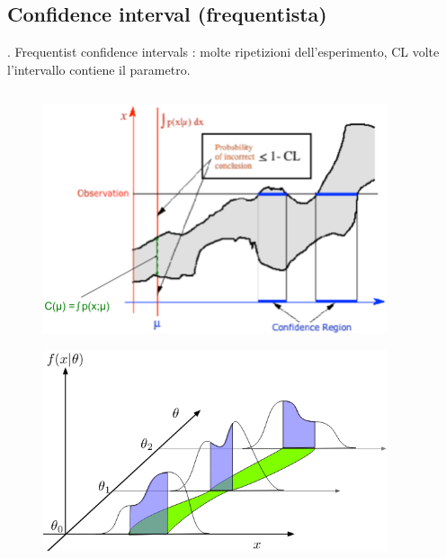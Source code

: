 \documentclass[asd-beamer.tex]{subfiles}
\begin{document}
\subsection{Confidence interval (frequentista)}

\begin{frame}{. Frequentist confidence intervals}
: molte ripetizioni dell'esperimento, CL volte l'intervallo contiene il parametro.
\begin{columns}[T]
\begin{column}{0.4\textwidth}
	\begin{figure}
		\centering
		\includegraphics[width=0.9\textwidth,keepaspectratio]{figures/interval/clband}
		\label{fig:clband}
	\end{figure}
	\begin{figure}
		\centering
		\includegraphics[width=0.9\textwidth,keepaspectratio]{figures/interval/neyman}
		\label{fig:neyman}
	\end{figure}
\end{column}

\end{columns}
\end{frame}
\end{document}
